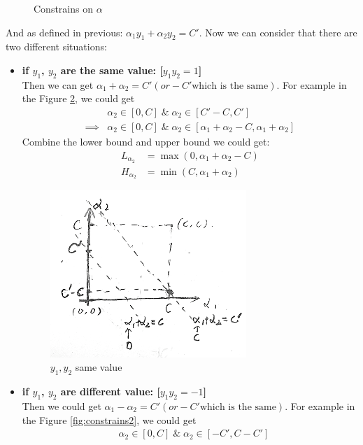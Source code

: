 \documentclass[a4paper]{article}
\begin{document}
\begin{enumerate}
{\begin{figure}[h!]
  \caption{Constrains on $\alpha$}\label{fig:constrain}
\end{figure}
And as defined in previous: $\alpha_1 y_1 + \alpha_2 y_2 = C'$.
Now we can consider that there are two different situations: 
\begin{itemize}
	\item{\textbf{if $y_1$, $y_2$ are the same value: [$y_1 y_2 = 1$]}\\
	Then we can get $\alpha_1 + \alpha_2 = C'(or -C' \text{which is the same})$. For example in the Figure \ref{fig:constrains1}, we could get 
	\begin{align*}
		& \alpha_2 \in [0, C] \; \& \; \alpha_2 \in [C' - C, C'] \\
		\implies & \alpha_2 \in [0, C] \; \& \; \alpha_2 \in [\alpha_1 + \alpha_2 - C, \alpha_1 + \alpha_2]
	\end{align*}
	Combine the lower bound and upper bound we could get:
	\begin{align*}
		L_{\alpha_2} &= \max{(0, \alpha_1 + \alpha_2 - C)} \\
		H_{\alpha_2} &= \min{(C, \alpha_1 + \alpha_2)}
	\end{align*}
	\begin{figure}[h!]
 	 \centering
   	 \includegraphics[width=0.7\textwidth]{./images/constrains1}
  	\caption{$y_1, y_2$ same value}\label{fig:constrains1}
	\end{figure}
	}
	\item{\textbf{if $y_1$, $y_2$ are different value: [$y_1 y_2 = -1$]} \\
	Then we could get $\alpha_1 - \alpha_2 = C' (or -C' \text{which is the same})$. For example in the Figure \ref{fig:constrains2}, we could get
	\begin{align*}
		& \alpha_2 \in [0, C] \; \& \; \alpha_2 \in [-C', C-C'] \\

\end{align*}}
\end{itemize}}
\end{enumerate}
\end{document}
